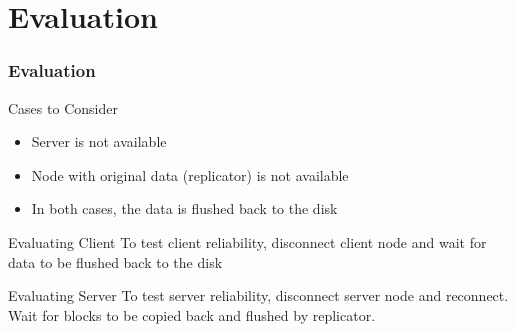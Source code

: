 \section{Evaluation}
%
\begin{frame}
    \frametitle{Evaluation}
    \begin{block}{Cases to Consider}
	\begin{itemize}
	    \item Server is not available
	    \item Node with original data (replicator) is not available
	    \item In both cases, the data is flushed back to the disk
	\end{itemize}
    \end{block}
    \begin{block}{Evaluating Client}
	To test client reliability, disconnect client node
	and wait for data to be flushed back to the disk
    \end{block}
    \begin{block}{Evaluating Server}
	To test server reliability, disconnect server node and reconnect.
	Wait for blocks to be copied back and flushed by replicator.
    \end{block}
\end{frame}
